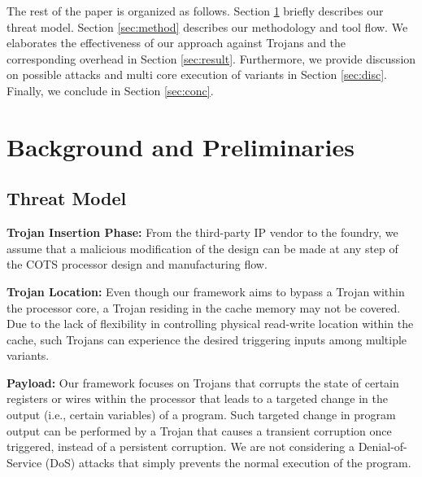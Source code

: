 \documentclass[conference]{IEEEtran}
\begin{document}
The rest of the paper is organized as follows. Section \ref{sec:pril} briefly describes our threat model. Section \ref{sec:method} describes our methodology and tool flow. %
We elaborates the effectiveness of our approach against Trojans and the corresponding overhead in Section \ref{sec:result}. Furthermore, we provide discussion on possible attacks and multi core execution of variants in Section \ref{sec:disc}. Finally, we conclude in Section \ref{sec:conc}. 

\section{Background and Preliminaries}
\label{sec:pril}


\subsection{Threat Model}
\textbf{Trojan Insertion Phase:}
From the third-party IP vendor to the foundry, we assume that a malicious modification of the design can be made at any step of the COTS processor design and manufacturing flow.

\textbf{Trojan Location:}
Even though our framework aims to bypass a Trojan within the processor core, a Trojan residing in the cache memory may not be covered. Due to the lack of flexibility in controlling physical read-write location within the cache, such Trojans can experience the desired triggering inputs among multiple variants. 

\textbf{Payload:}
Our framework focuses on Trojans that corrupts the state of certain registers or wires within the processor that leads to a targeted change in the output (i.e., certain variables) of a program. Such targeted change in program output can be performed by a Trojan that causes a transient corruption once triggered, instead of a persistent corruption. 
We are not considering a Denial-of-Service (DoS) attacks that simply prevents the normal execution of the program. 

\end{document}
